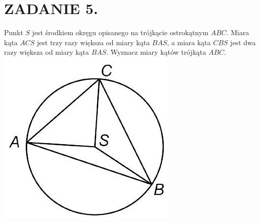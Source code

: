 \documentclass[10pt]{article}
\begin{document}
\section*{ZADANIE 5.}
Punkt \(S\) jest środkiem okręgu opisanego na trójkącie ostrokątnym \(A B C\). Miara kąta \(A C S\) jest trzy razy większa od miary kąta \(B A S\), a miara kąta \(C B S\) jest dwa razy większa od miary kąta \(B A S\). Wyznacz miary kątów trójkąta \(A B C\).\\
\includegraphics[max width=\textwidth, center]{2024_11_21_bf918c4f5acb20cb8c1bg-1}
\end{document}
